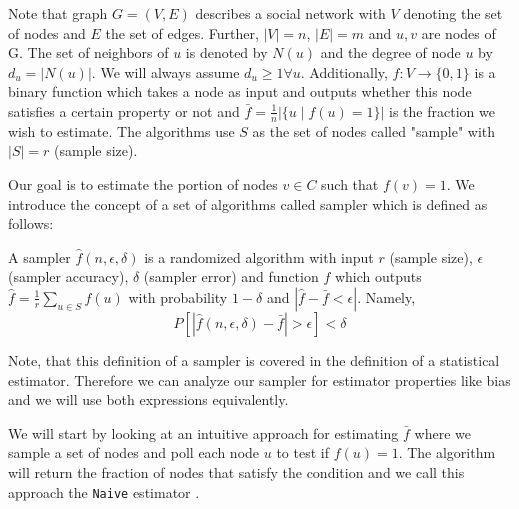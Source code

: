 Note that graph $G = (V,E)$ describes a social network with $V$ denoting the set of nodes and $E$ the set of edges. Further, $|V| = n$, $|E| = m$ and $u,v$ are nodes of G. The set of neighbors of $u$ is denoted by $N(u)$ and the degree of node $u$ by $d_u=|N(u)|$. We will always assume $d_u \geq 1  \forall u$. Additionally, $f : V \rightarrow \{0,1\}$ is a binary function which takes a node as input and outputs whether this node satisfies a certain property or not and $\bar{f} = \frac{1}{n}|\{u\;|\;f(u) = 1\}|$ is the fraction we wish to estimate.
The algorithms use $S$ as the set of nodes called "sample" with $|S| = r$ (sample size).

Our goal is to estimate the portion of nodes $v \in C$ such that $f(v) = 1$.
We introduce the concept of a set of algorithms called sampler which is defined as follows:
\begin{definition}[sampler]
  A sampler $\hat{f}(n,\epsilon,\delta)$ is a randomized algorithm with input $r$ (sample size), $\epsilon$ (sampler accuracy), $\delta$ (sampler error) and function $f$ which outputs $\hat{f}=\frac{1}{r}\sum\nolimits_{u\in S} f(u)$ with probability $1-\delta$ and $|\hat{f}-\bar{f}<\epsilon|$. Namely,
  $$P[|\hat{f}(n,\epsilon,\delta)-\bar{f} | > \epsilon] < \delta$$
\end{definition}

Note, that this definition of a sampler is covered in the definition of a statistical estimator.
Therefore we can analyze our sampler for estimator properties like bias and we will use both expressions equivalently.

We will start by looking at an intuitive approach for estimating $\bar{f}$ where we sample a set of nodes and poll each node $u$ to test if $f(u)=1$.
The algorithm will return the fraction of nodes that satisfy the condition and we call this approach the \texttt{Naive} estimator \cite{goldreich1997sample}.

